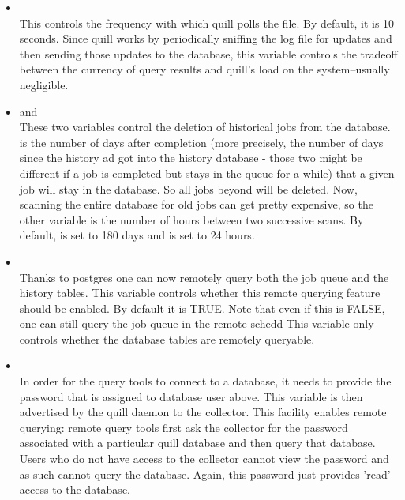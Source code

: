 \begin{enumerate}
\begin{itemize}
\item {}\\
This controls the frequency with which quill polls the
 file.  By default, it is 10 seconds.  Since quill
works by periodically sniffing the log file for updates and then sending
those updates to the database, this variable controls the tradeoff between
the currency of query results and quill's load on the system--usually
negligible.

\item {} and 
		\\
These two variables control the deletion of historical jobs from the
database.   is the number of days
after completion (more precisely, the number of days since the history ad got 
into the history database - those two might be different if a job is completed 
but stays in the queue for a while) that a given job will stay in the database.  
So all jobs beyond  will be deleted.  Now,
scanning the entire database for old jobs can get pretty expensive,
so the other variable 
is the number of hours between two successive scans.  By default,
 is set to 180 days and
 is set to 24 hours.

\item {}\\
Thanks to postgres one can now remotely query both the job queue and the
history tables. This variable controls whether this remote querying 
feature should be enabled.  By default it is TRUE.  Note that even if 
this is FALSE, one can still query the job queue in the remote schedd
This variable only controls whether the database tables are remotely queryable.

\item {}\\
In order for the query tools to connect to a database, it needs to provide
the password that is assigned to database user  above. 
This variable is then advertised by the quill daemon to the collector.  
This facility enables remote querying: remote  query tools first 
ask the collector for the password associated with a particular quill database 
and then query that database.  Users who do not have access to the collector 
cannot view the password and as such cannot query the database.  Again, this 
password just provides 'read' access to the database.


\end{itemize}
\end{enumerate}
